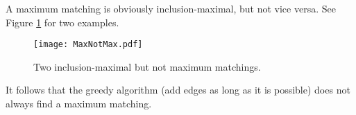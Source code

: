 
A maximum matching is obviously inclusion-maximal, but not vice versa.
See Figure \ref{fig:MaxNotMax} for two examples.

\begin{figure}[ht]
\begin{center}
\texttt{[image: MaxNotMax.pdf]}
\end{center}
\caption{Two inclusion-maximal but not maximum matchings.}
\label{fig:MaxNotMax}
\end{figure}

It follows that the greedy algorithm (add edges as long as it is possible) does not always find a maximum matching.


